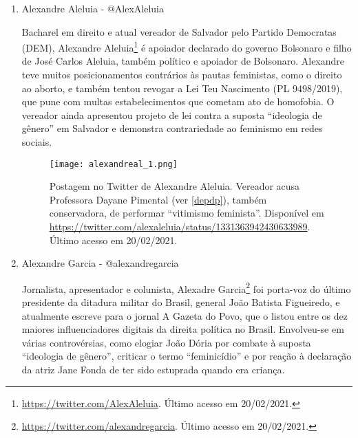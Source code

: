 \documentclass[
	12pt,				%
	openright,			%
	twoside,			%
	a4paper,			%
	english,			%
	brazil				%
	]{abntex2}
\begin{document}
\begin{anexosenv}
\begin{enumerate}
 \newpage
 
 \item Alexandre Aleluia - @AlexAleluia
 
 Bacharel em direito e atual vereador de Salvador pelo Partido Democratas (DEM), Alexandre Aleluia\footnote{\url{https://twitter.com/AlexAleluia}. Último acesso em 20/02/2021.} é apoiador declarado do governo Bolsonaro e filho de José Carlos Aleluia, também político e apoiador de Bolsonaro. Alexandre teve muitos posicionamentos contrários às pautas feministas, como o direito ao aborto, e também tentou revogar a Lei Teu Nascimento (PL 9498/2019), que pune com multas estabelecimentos que cometam ato de homofobia. O vereador ainda apresentou projeto de lei contra a suposta ``ideologia de gênero'' em Salvador e demonstra contrariedade ao feminismo em redes sociais.

 \begin{figure}[!htbp]
    \centering
    \texttt{[image: alexandreal\_1.png]}
    \caption{Postagem no Twitter de Alexandre Aleluia. Vereador acusa Professora Dayane Pimental (ver \ref{depdp}), também conservadora, de performar ``vitimismo feminista''. Disponível em \url{https://twitter.com/alexaleluia/status/1331363942430633989}. Último acesso em 20/02/2021.}
    \label{fig:aleluia}
 \end{figure}

 \item Alexandre Garcia - @alexandregarcia
 
 Jornalista, apresentador e colunista, Alexadre Garcia\footnote{\url{https://twitter.com/alexandregarcia}. Último acesso em 20/02/2021.} foi porta-voz do último presidente da ditadura militar do Brasil, general João Batista Figueiredo, e atualmente escreve para o jornal A Gazeta do Povo, que o listou entre os dez maiores influenciadores digitais da direita política no Brasil. Envolveu-se em várias controvérsias, como elogiar João Dória por combate à suposta ``ideologia de gênero'', criticar o termo ``feminicídio'' e por reação à declaração da atriz Jane Fonda de ter sido estuprada quando era criança.



\end{enumerate}
\end{anexosenv}
\end{document}
